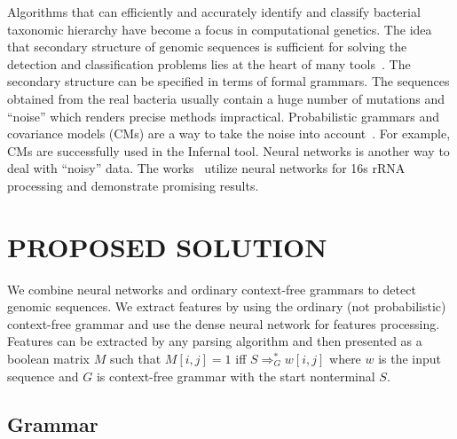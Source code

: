 \documentclass[a4paper,twoside]{article}
\begin{document}
\noindent Algorithms that can efficiently and accurately identify and classify bacterial taxonomic hierarchy have become a focus in computational genetics.
The idea that secondary structure of genomic sequences is sufficient for solving the detection and classification problems lies at the heart of many tools~\cite{GrammarsRNA,PCFG,meta,LWPCFG}. 
The secondary structure can be specified in terms of formal grammars. 
The sequences obtained from the real bacteria usually contain a huge number of mutations and ``noise'' which renders precise methods impractical. 
Probabilistic grammars and covariance models (CMs) are a way to take the noise into account~\cite{EddyDurbin}.
For example, CMs are successfully used in the Infernal tool.%
Neural networks is another way to deal with ``noisy'' data. 
The works~\cite{Humidor,ANN} utilize neural networks for 16s rRNA processing and demonstrate promising results. 
%

\section{\uppercase{Proposed solution}}
\label{sec:proposedSolution}

\noindent We combine neural networks and ordinary context-free grammars to detect genomic sequences. 
We extract features by using the ordinary (not probabilistic) context-free grammar and use the dense neural network for features processing.
Features can be extracted by any parsing algorithm and then presented as a boolean matrix $M$ such that $M[i,j]=1$ iff $S \Rightarrow^*_G w[i,j]$ where $w$ is the input sequence and $G$ is context-free grammar with the start nonterminal $S$.

\subsection{Grammar}
\end{document}
